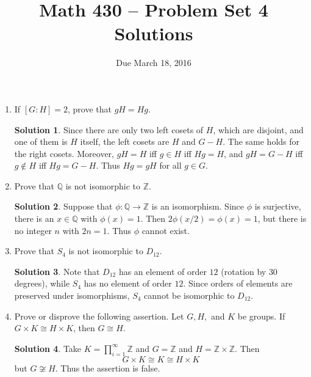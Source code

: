 \documentclass{article}
\title{Math 430 -- Problem Set 4 Solutions}
\date{Due March 18, 2016}
\newcommand{\QQ}{\mathbb{Q}}
\newcommand{\ZZ}{\mathbb{Z}}
\theoremstyle{definition}
\newtheorem*{solution}{Solution}
\begin{document}
\maketitle


\begin{enumerate}
\item[6.18.] If $[G:H] = 2$, prove that $gH = Hg$.
\begin{solution}
Since there are only two left cosets of $H$, which are disjoint, and one of them is $H$ itself, the left cosets are $H$ and $G - H$.  The same holds for the right cosets.  Moreover, $gH = H$ iff $g \in H$ iff $Hg = H$, and $gH = G-H$ iff $g \not\in H$ iff $Hg = G-H$.  Thus $Hg = gH$ for all $g \in G$.
\end{solution}

\item[9.8.] Prove that $\QQ$ is not isomorphic to $\ZZ$.
\begin{solution} 
Suppose that $\phi : \QQ \to \ZZ$ is an isomorphism.  Since $\phi$ is surjective, there is an $x \in \QQ$ with $\phi(x) = 1$.  Then $2 \phi(x/2) = \phi(x) = 1$, but there is no integer $n$ with $2n = 1$.  Thus $\phi$ cannot exist.
\end{solution}
\item[9.12.] Prove that $S_4$ is not isomorphic to $D_{12}$.
\begin{solution}
Note that $D_{12}$ has an element of order $12$ (rotation by $30$ degrees), while $S_4$ has no element of order $12$.  Since orders of elements are preserved under isomorphisms, $S_4$ cannot be isomorphic to $D_{12}$.
\end{solution}
\item[9.23.] Prove or disprove the following assertion.  Let $G, H,$ and $K$ be groups. If $G \times K \cong H \times K$, then $G \cong H$.
\begin{solution}
Take $K = \prod_{i=1}^\infty \ZZ$ and $G = \ZZ$ and $H = \ZZ \times \ZZ$.  Then
\[
G \times K \cong K \cong H \times K
\]
but $G \not\cong H$.  Thus the assertion is false.


\end{solution}
\end{enumerate}
\end{document}
